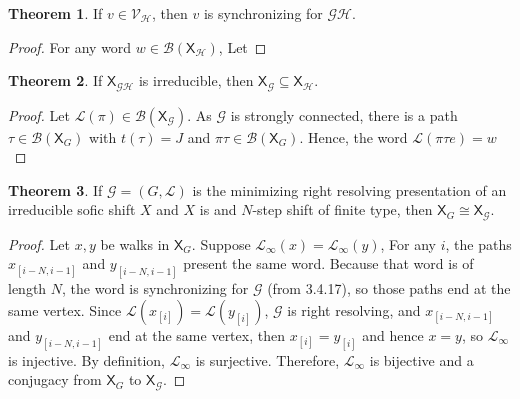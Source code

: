 \documentclass{article}
\newcommand{\Lc}{\mathcal{L}}  %
\newcommand{\Gc}{\mathcal{G}}  %
\newcommand{\Hc}{\mathcal{H}}  %
\newcommand{\Vc}{\mathcal{V}}
\newcommand{\Ec}{\mathcal{E}}
\newcommand{\Bc}{\mathcal{B}}
\newcommand{\shift}[1]{\mathsf{X}_{#1}}
\newcommand{\term}[1]{\textit{#1}}
\theoremstyle{definition}
\newtheorem{theorem}{Theorem}
\newtheorem{definition}{Definition}
\begin{document}
\begin{theorem}
    If \(v \in \Vc_\Hc\), then \(v\) is synchronizing for \(\Gc\Hc\).
\end{theorem}

\begin{proof}
    For any word \(w \in \Bc(\shift{\Hc})\), Let
\end{proof}

\begin{theorem}
    If \(\shift{\Gc\Hc}\) is irreducible, then \(\shift{\Gc} \subseteq \shift{\Hc}\).
\end{theorem}

\begin{proof}
    Let \(\Lc(\pi) \in \Bc(\shift{\Gc})\). As \(\Gc\) is strongly connected,
    there is a path \(\tau \in \Bc(\shift{G})\) with \(t(\tau) = J\) and \(\pi\tau \in \Bc(\shift{G})\).
    Hence, the word \(\Lc(\pi\tau e) = w\) 
\end{proof}

    \begin{theorem}
        If \(\mathcal{G} = (G, \mathcal{L})\) is the minimizing right resolving
        presentation of an irreducible sofic shift \(X\) and \(X\) is and
        \(N\)-step shift of finite type, then \(\shift{G} \cong \shift{\Gc}\).
    \end{theorem}
    
    \begin{proof}
        Let \(x, y\) be walks in \(\shift{G}\). Suppose \(\mathcal{L}_\infty(x)=\mathcal{L}_\infty(y)\),
        For any \(i\), the paths \(x_{[i-N, i-1]}\) and \(y_{[i-N, i-1]}\) present 
        the same word. Because that word is of length \(N\), the word is synchronizing
        for \(\mathcal{G}\) (from 3.4.17), so those paths end at the same vertex. Since
        \(\mathcal{L}(x_{[i]}) = \mathcal{L}(y_{[i]})\), \(\mathcal{G}\) is right 
        resolving, and \(x_{[i-N, i-1]}\) and \(y_{[i-N, i-1]}\) end at the same vertex,
        then \(x_{[i]} = y_{[i]}\) and hence \(x = y\), so \(\mathcal{L}_\infty\) is injective.
        By definition, \(\mathcal{L}_\infty\) is surjective. Therefore, \(\mathcal{L}_\infty\) is bijective and 
        a conjugacy from \(\mathsf{X}_G\) to \(\mathsf{X}_\mathcal{G}\).
    \end{proof}



\end{document}
